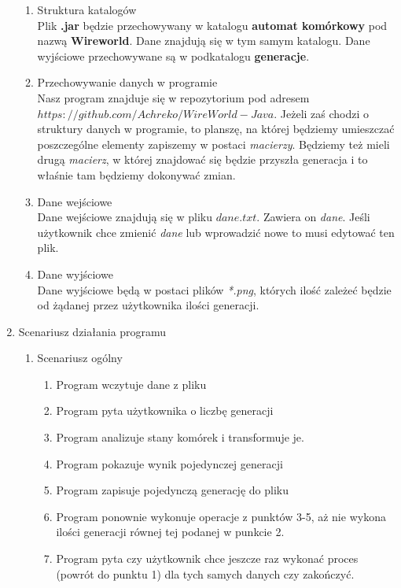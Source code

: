 \documentclass[11pt]{article}
\begin{document}
\begin{enumerate}
\begin{enumerate}[label=\arabic{enumi}.\arabic*.]
 \item Struktura katalogów\\
 Plik \textbf{.jar} będzie przechowywany w katalogu \textbf{automat komórkowy} pod nazwą \textbf{Wireworld}. Dane znajdują się w tym samym katalogu. Dane wyjściowe przechowywane są w podkatalogu \textbf{generacje}.
 \item Przechowywanie danych w programie\\
 Nasz program znajduje się w repozytorium pod adresem $https://github.com/Achreko/WireWorld-Java$. Jeżeli zaś chodzi o struktury danych w programie, to planszę, na której będziemy umieszczać poszczególne elementy zapiszemy w postaci \textit{macierzy}. Będziemy też mieli drugą \textit{macierz}, w której znajdować się będzie przyszła generacja i to właśnie tam będziemy dokonywać zmian.\\
 \item Dane wejściowe\\
 Dane wejściowe znajdują się w pliku $dane.txt$. Zawiera on \textit{dane}.
 Jeśli użytkownik chce zmienić \textit{dane} lub wprowadzić nowe to musi edytować ten plik.\\
 \item Dane wyjściowe\\
 Dane wyjściowe będą w postaci plików \textit{*.png}, których ilość zależeć będzie od żądanej przez użytkownika ilości generacji.
 \end{enumerate}
 

\item Scenariusz działania programu


\begin{enumerate}[label=\arabic{enumi}.\arabic*.]
\item Scenariusz ogólny
\begin{enumerate}[label*=\arabic*.]
\item Program wczytuje dane z pliku 
\item Program pyta użytkownika o liczbę generacji
\item Program analizuje stany komórek i transformuje je.
\item Program pokazuje wynik pojedynczej generacji
\item Program zapisuje pojedynczą generację do pliku
\item Program ponownie wykonuje operacje z punktów 3-5, aż nie wykona ilości generacji równej tej 		podanej w punkcie 2.
\item Program pyta czy użytkownik chce jeszcze raz wykonać proces (powrót do punktu 1) dla tych 		samych danych czy zakończyć.\\
\end{enumerate}




\end{enumerate}
\end{enumerate}
\end{document}
